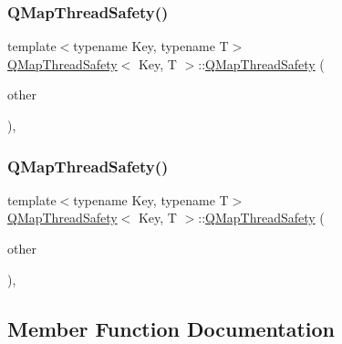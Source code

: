 \subsubsection{\texorpdfstring{Q\+Map\+Thread\+Safety()}{QMapThreadSafety()}\hspace{0.1cm}{\footnotesize\ttfamily [4/5]}}
{\footnotesize\ttfamily template$<$typename Key, typename T$>$ \\
\hyperlink{class_q_map_thread_safety}{Q\+Map\+Thread\+Safety}$<$ Key, T $>$\+::\hyperlink{class_q_map_thread_safety}{Q\+Map\+Thread\+Safety} (\begin{DoxyParamCaption}\item[{const std\+::map$<$ Key, T $>$ \&}]{other }\end{DoxyParamCaption})\hspace{0.3cm}{\ttfamily [inline]}, {\ttfamily [explicit]}}

\mbox{\label{class_q_map_thread_safety_a9aacfb2a81fb927546a222cbfd78000d}} 
\subsubsection{\texorpdfstring{Q\+Map\+Thread\+Safety()}{QMapThreadSafety()}\hspace{0.1cm}{\footnotesize\ttfamily [5/5]}}
{\footnotesize\ttfamily template$<$typename Key, typename T$>$ \\
\hyperlink{class_q_map_thread_safety}{Q\+Map\+Thread\+Safety}$<$ Key, T $>$\+::\hyperlink{class_q_map_thread_safety}{Q\+Map\+Thread\+Safety} (\begin{DoxyParamCaption}\item[{Q\+Map$<$ Key, T $>$ \&\&}]{other }\end{DoxyParamCaption})\hspace{0.3cm}{\ttfamily [inline]}, {\ttfamily [explicit]}}



\subsection{Member Function Documentation}
\mbox{\label{class_q_map_thread_safety_ac197a5375913e4ac19910b9bc4191a95}} 
